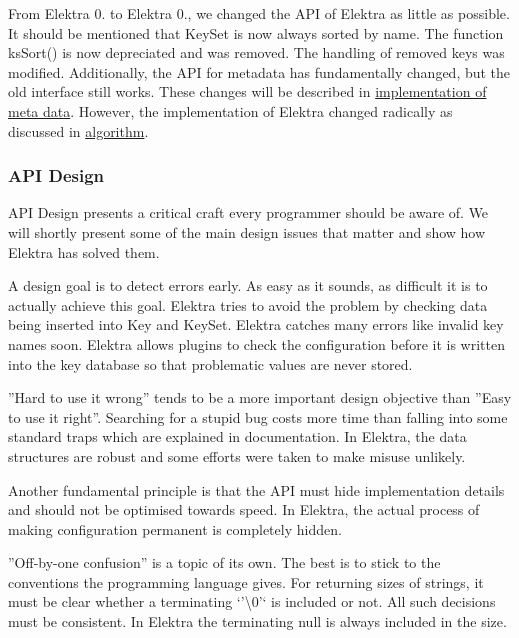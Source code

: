 From Elektra 0. to Elektra 0., we changed the A\+P\+I of Elektra as little as possible. It should be mentioned that {\ttfamily Key\+Set} is now always sorted by name. The function {\ttfamily ks\+Sort()} is now depreciated and was removed. The handling of removed keys was modified. Additionally, the A\+P\+I for metadata has fundamentally changed, but the old interface still works. These changes will be described in \hyperlink{md_doc_help_elektra-meta-data_doc_help_elektra-meta-data_md}{implementation of meta data}. However, the implementation of Elektra changed radically as discussed in \hyperlink{md_doc_help_elektra-algorithm_doc_help_elektra-algorithm_md}{algorithm}.

\subsubsection*{A\+P\+I Design}

A\+P\+I Design presents a critical craft every programmer should be aware of. We will shortly present some of the main design issues that matter and show how Elektra has solved them.

A design goal is to detect errors early. As easy as it sounds, as difficult it is to actually achieve this goal. Elektra tries to avoid the problem by checking data being inserted into {\ttfamily Key} and {\ttfamily Key\+Set}. Elektra catches many errors like invalid key names soon. Elektra allows plugins to check the configuration before it is written into the key database so that problematic values are never stored.

''Hard to use it wrong'' tends to be a more important design objective than ''Easy to use it right''. Searching for a stupid bug costs more time than falling into some standard traps which are explained in documentation. In Elektra, the data structures are robust and some efforts were taken to make misuse unlikely.

Another fundamental principle is that the A\+P\+I must hide implementation details and should not be optimised towards speed. In Elektra, the actual process of making configuration permanent is completely hidden.

''Off-\/by-\/one confusion'' is a topic of its own. The best is to stick to the conventions the programming language gives. For returning sizes of strings, it must be clear whether a terminating `'\textbackslash{}0'` is included or not. All such decisions must be consistent. In Elektra the terminating null is always included in the size.

